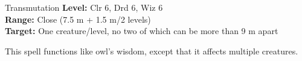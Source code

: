 {Transmutation}
{
	\textbf{Level:}
	Clr 6, Drd 6, Wiz 6\\
	\textbf{Range:}
	Close (7.5 m + 1.5 m/2 levels)\\
	\textbf{Target:}
	One creature/level, no two of which can be more than 9 m apart\\
}
{
	This spell functions like owl's wisdom, except that it affects multiple creatures.

}
